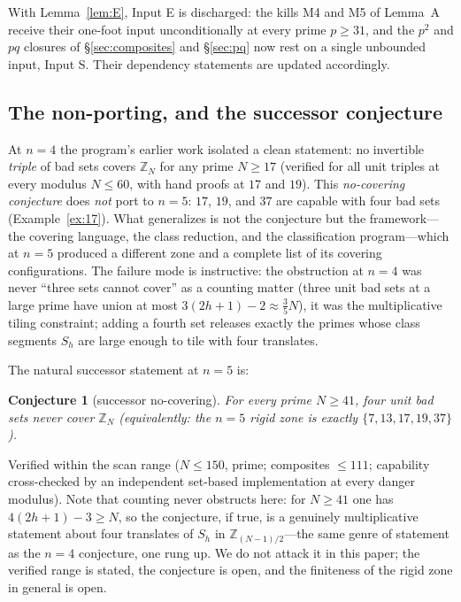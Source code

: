 \documentclass[11pt,a4paper]{article}
\numberwithin{equation}{section}
\theoremstyle{plain}
\theoremstyle{plain}
\newtheorem{conjecture}[theorem]{Conjecture}
\theoremstyle{definition}
\theoremstyle{remark}
\newcommand{\Z}{\mathbb{Z}}
\begin{document}
With Lemma~\ref{lem:E}, Input E is discharged: the kills M4 and M5 of
Lemma~A receive their one-foot input unconditionally at every prime
$p\ge31$, and the $p^2$ and $pq$ closures of \S\ref{sec:composites} and
\S\ref{sec:pq} now rest on a single unbounded input, Input S. Their
dependency statements are updated accordingly.

\subsection{The non-porting, and the successor conjecture}

At $n=4$ the program's earlier work isolated a clean statement: no
invertible \emph{triple} of bad sets covers $\Z_N$ for any prime
$N\ge 17$ (verified for all unit triples at every modulus $N\le 60$, with
hand proofs at $17$ and $19$). This \emph{no-covering conjecture} does
\emph{not} port to $n=5$: $17$, $19$, and $37$ are capable with four bad
sets (Example~\ref{ex:17}). What generalizes is not the conjecture but the
framework---the covering language, the class reduction, and the
classification program---which at $n=5$ produced a different zone and a
complete list of its covering configurations. The failure mode is
instructive: the obstruction at $n=4$ was never ``three sets cannot
cover'' as a counting matter (three unit bad sets at a large prime have
union at most $3(2h+1)-2\approx \tfrac35 N$), it was the multiplicative
tiling constraint; adding a fourth set releases exactly the primes whose
class segments $S_h$ are large enough to tile with four translates.

The natural successor statement at $n=5$ is:

\begin{conjecture}[successor no-covering]\label{conj:successor}
For every prime $N\ge 41$, four unit bad sets never cover $\Z_N$
(equivalently: the $n=5$ rigid zone is exactly $\{7,13,17,19,37\}$).
\end{conjecture}

\noindent Verified within the scan range ($N\le 150$, prime; composites
$\le 111$; capability cross-checked by an independent set-based
implementation at every danger modulus). Note that counting never
obstructs here: for $N\ge 41$ one has $4(2h+1)-3\ge N$, so the
conjecture, if true, is a genuinely multiplicative statement about four
translates of $S_h$ in $\Z_{(N-1)/2}$---the same genre of statement as
the $n=4$ conjecture, one rung up. We do not attack it in this paper; the
verified range is stated, the conjecture is open, and the finiteness of
the rigid zone in general is open.
\end{document}
